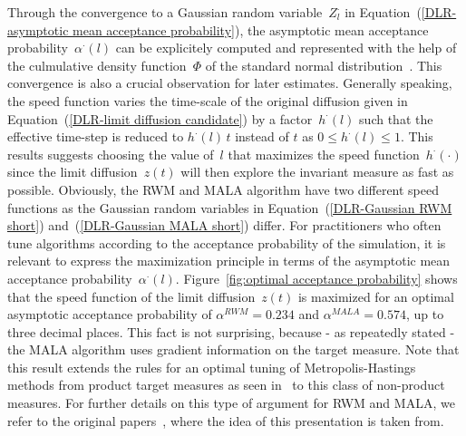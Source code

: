 Through the convergence to a Gaussian random variable~$Z_l^{\cdot}$ in Equation~(\ref{DLR-asymptotic mean acceptance probability}), the asymptotic mean acceptance probability~$\alpha^{\cdot}(l)$ can be explicitely computed and represented with the help of the culmulative density function~$\Phi$ of the standard normal distribution~\autocite[Lemma B2]{Beskos2009-2}. This convergence is also a crucial observation for later estimates. Generally speaking, the speed function varies the time-scale of the original diffusion given in Equation~(\ref{DLR-limit diffusion candidate}) by a factor~$h^{\cdot}(l)$ such that the effective time-step is reduced to $h^{\cdot}(l)\,t$ instead of $t$ as $ 0 \leq h^{\cdot}(l) \leq 1$. This results suggests choosing the value of~$l$ that maximizes the speed function~$h^{\cdot}(\cdot)$ since the limit diffusion~$z(t)$ will then explore the invariant measure as fast as possible. Obviously, the RWM and MALA algorithm have two different speed functions as the Gaussian random variables in Equation~(\ref{DLR-Gaussian RWM short}) and~(\ref{DLR-Gaussian MALA short}) differ. For practitioners who often tune algorithms according to the acceptance probability of the simulation, it is relevant to express the maximization principle in terms of the asymptotic mean acceptance probability~$\alpha^{\cdot}(l)$. Figure~\ref{fig:optimal acceptance probability} shows that the speed function of the limit diffusion~$z(t)$ is maximized for an optimal asymptotic acceptance probability of $\alpha^{RWM}=0.234$ and $\alpha^{MALA}=0.574$, up to three decimal places. This fact is not surprising, because - as repeatedly stated - the MALA  algorithm uses gradient information on the target measure. Note that this result extends the rules for an optimal tuning of Metropolis-Hastings methods from product target measures as seen in~\autocite{Bedard2007, Roberts1997, Roberts1998} to this class of non-product measures. For further details on this type of argument for RWM and MALA, we refer to the original papers~\autocite[Section 2.3, Section 2.6]{Mattingly2010, Pillai2012}, where the idea of this presentation is taken from.

